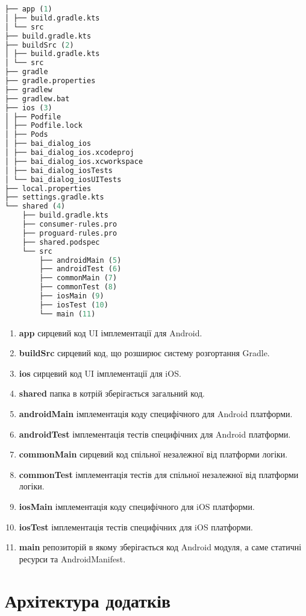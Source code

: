 \begin{lstlisting}[style=light, language=Python,label={lst:kmm_project_layout},caption=KMM Project Layout]
├── app (1)
│ ├── build.gradle.kts
│ └── src
├── build.gradle.kts
├── buildSrc (2)
│ ├── build.gradle.kts
│ └── src
├── gradle
├── gradle.properties
├── gradlew
├── gradlew.bat
├── ios (3)
│ ├── Podfile
│ ├── Podfile.lock
│ ├── Pods
│ ├── bai_dialog_ios
│ ├── bai_dialog_ios.xcodeproj
│ ├── bai_dialog_ios.xcworkspace
│ ├── bai_dialog_iosTests
│ └── bai_dialog_iosUITests
├── local.properties
├── settings.gradle.kts
└── shared (4)
    ├── build.gradle.kts
    ├── consumer-rules.pro
    ├── proguard-rules.pro
    ├── shared.podspec
    └── src
        ├── androidMain (5)
        ├── androidTest (6)
        ├── commonMain (7)
        ├── commonTest (8)
        ├── iosMain (9)
        ├── iosTest (10)
        └── main (11)
\end{lstlisting}

\begin{enumerate}
    \item \textbf{app} сирцевий код UI імплементації для Android.
    \item \textbf{buildSrc} сирцевий код, що розширює систему розгортання Gradle.
    \item \textbf{ios} сирцевий код UI імплементації для iOS.
    \item \textbf{shared} папка в котрій зберігається загальний код.
    \item \textbf{androidMain} імплементація коду специфічного для Android платформи.
    \item \textbf{androidTest} імплементація тестів специфічних для Android платформи.
    \item \textbf{commonMain} сирцевий код спільної незалежної від платформи логіки.
    \item \textbf{commonTest} імплементація тестів для спільної незалежної від платформи логіки.
    \item \textbf{iosMain} імплементація коду специфічного для iOS платформи.
    \item \textbf{iosTest} імплементація тестів специфічних для iOS платформи.
    \item \textbf{main} репозиторій в якому зберігається код Android модуля, а саме статичні ресурси та AndroidManifest.
\end{enumerate}

\section{Архітектура додатків}
\label{sec:general_app_architecture}


